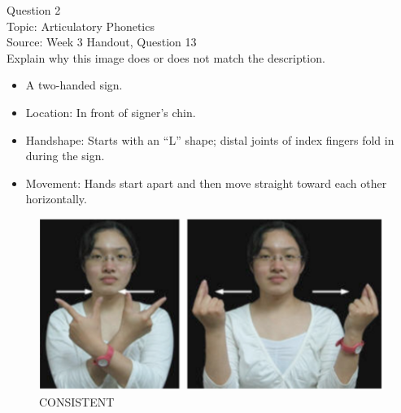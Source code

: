 \documentclass[12pt]{article}
\begin{document}
\newpage

{\large Question 2}\\

Topic: Articulatory Phonetics\\
Source: Week 3 Handout, Question 13\\

Explain why this image does or does not match the description.\\

\begin{itemize} \item A two-handed sign. \item Location: In front of signer’s chin. \item Handshape: Starts with an “L” shape; distal joints of index fingers fold in during the sign. \item Movement: Hands start apart and then move straight toward each other horizontally. \end{itemize}

\begin{figure}[H]
\includegraphics{../images/taiwansign_consistent.png}
\caption{CONSISTENT}
\end{figure}

\newpage

\begin{center}
\textbf{{\color{red}{\HUGE END OF EXAM}}}\\

\end{center}
\newpage

\begin{center}
\textbf{{\color{blue}{\HUGE START OF EXAM\\}}}

\textbf{{\color{blue}{\HUGE Student ID: 83841\\}}}

\textbf{{\color{blue}{\HUGE 10:20\\}}}

\end{center}
\newpage
\end{document}
